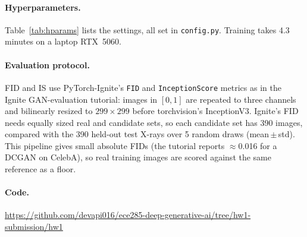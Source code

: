 \documentclass{article}
\newcommand{\codeurl}{https://github.com/devapi016/ece285-deep-generative-ai/tree/hw1-submission/hw1}
\begin{document}
\paragraph{Hyperparameters.}
Table~\ref{tab:hparams} lists the settings, all set in \texttt{config.py}.
Training takes 4.3 minutes on a laptop RTX~5060.

\paragraph{Evaluation protocol.}
FID and IS use PyTorch-Ignite's \texttt{FID} and \texttt{InceptionScore}
metrics as in the Ignite GAN-evaluation tutorial: images in $[0,1]$ are
repeated to three channels and bilinearly resized to $299\times299$ before
torchvision's InceptionV3. Ignite's FID needs equally sized real and candidate
sets, so each candidate set has 390 images, compared with the 390 held-out
test X-rays over 5 random draws (mean\,$\pm$\,std). This pipeline gives small absolute FIDs (the tutorial reports
$\approx$0.016 for a DCGAN on CelebA), so real training images are scored
against the same reference as a floor.

\paragraph{Code.} \href{\codeurl}{\mbox{https://github.com/devapi016/ece285-deep-generative-ai/tree/hw1-submission/hw1}}
\end{document}
